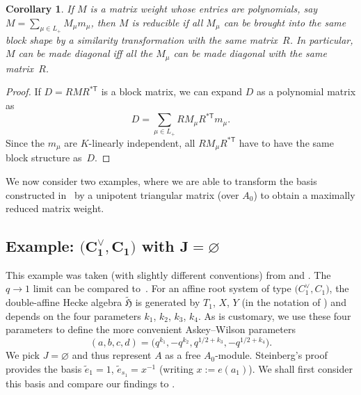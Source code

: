 \documentclass[pdftex]{sigma}
\newtheorem{Corollary}[Theorem]{Corollary}
\theoremstyle{definition}
\numberwithin{equation}{section}
\begin{document}
\begin{Corollary}\label{sec:cor-shi-block-structure}
 If $M$ is a matrix weight whose entries are polynomials,
 say $M= \sum_{\mu\in L_+} M_\mu m_\mu$, then $M$ is reducible if all
 $M_\mu$ can be brought into the same block shape by a similarity transformation
 with the same matrix~$R$.
 In particular, $M$ can be made diagonal iff all the $M_\mu$ can be made diagonal
 with the same matrix~$R$.
\end{Corollary}
\begin{proof}
 If $D=RMR^{*{\mathsf T}}$ is a block matrix, we can expand $D$ as a polynomial matrix as
 \[
 D = \sum_{\mu\in L_+} R M_\mu R^{*{\mathsf T}} m_\mu.
 \]
 Since the $m_\mu$ are $K$-linearly independent, all $R M_\mu R^{*{\mathsf T}}$ have to
 have the same block structure as~$D$.
\end{proof}

We now consider two examples, where we are able to
transform the basis constructed in~\cite{pittieSteinberg} by a
unipotent triangular matrix (over $A_0$) to obtain a maximally reduced
matrix weight.

\subsection[Example: (C\_1\^{}vee, C\_1) with J=varnothing]{Example: $\boldsymbol{\bigl(C_1^\vee, C_1\bigr)}$ with $\boldsymbol{J=\varnothing}$}
This example was taken (with slightly different conventions) from
\cite{koornwinderBouzeffour} and \cite[Section~6]{koornwinderMazzocco}. The~${q\to1}$ limit can be compared to~\cite{mvpBC1}. For
an affine root system of type $\bigl(C_1^\vee, C_1\bigr)$, the double-affine Hecke
algebra $\tilde{\mathfrak{H}}$ is
generated by $T_1$, $X$, $Y$ (in the notation of \cite[Section~6.4]{macdonald}) and depends on the four parameters
$k_1$, $k_2$, $k_3$, $k_4$. As is customary, we use these four parameters to define
the more convenient Askey--Wilson parameters
\[
 (a,b,c,d) = \bigl(q^{k_1},-q^{k_2},q^{1/2+k_3},-q^{1/2+k_4}\bigr).
\]
We pick $J=\varnothing$ and thus represent $A$ as a free $A_0$-module.
Steinberg's proof provides the basis $\tilde{e}_1=1$, $\tilde{e}_{s_1} = x^{-1}$ (writing $x:= e(a_1)$).
We shall first consider this basis and compare our findings to
\cite{mvpBC1}.
\end{document}
